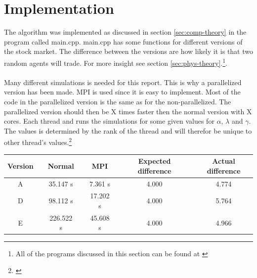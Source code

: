 \pagebreak
\section{Implementation}


The algorithm was implemented as discussed in section \ref{sec:comp-theory} in the program called main.cpp. main.cpp has some functions for different versions of the stock market. The difference between the versions are how likely it is that two random agents will trade. For more insight see section \ref{sec:phys-theory}.\footnote{All of the programs discussed in this section can be found at \href{https://github.com/erikfsk/Project-5/tree/master/Project5}{\color{blue}{github}}}.
\\
\\
Many different simulations is needed for this report. This is why a parallelized version has been made. MPI is used since it is easy to implement. Most of the code in the parallelized version is the same as for the non-parallelized. The parallelized version should then be X times faster then the normal version with X cores. Each thread and runs the simulations for some given values for $\alpha$, $\lambda$ and $\gamma$. The values is determined by the rank of the thread and will therefor be unique to other thread's values.\footnote{\href{https://www.intel.com/content/www/us/en/architecture-and-technology/hyper-threading/hyper-threading-technology.html}{\color{blue}{Intel Hyper-Threading Technology}}}


\begin{center}
\label{tab:parallell}
\begin{tabularx}{\textwidth}{c X c X c X c X c}
    \hline 
    \hline 
       	Version && Normal && MPI && Expected difference && Actual difference\\ 
    \hline
        A   	&&      35.147  s	&&		7.361 s 	&&	4.000	&&	4.774	\\  
        D   	&&      98.112  s	&&		17.202 s	&&	4.000	&&	5.764	\\
        E   	&&      226.522 s	&&		45.608 s	&&	4.000	&&	4.966	\\
    \hline
\end{tabularx}
\end{center}


